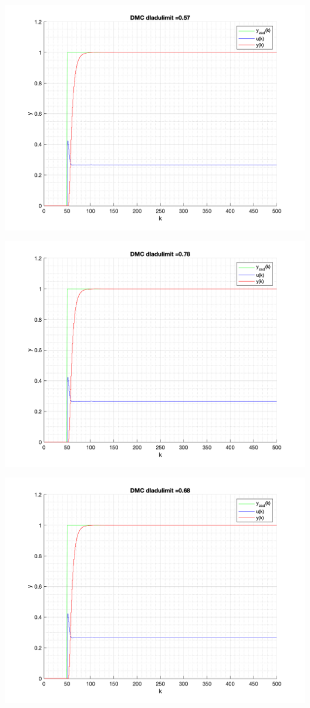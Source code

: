 \documentclass[a4paper, 11pt]{article}
\begin{document}
\begin{enumerate}
 \includegraphics[width=\linewidth]{./ModelsP6_dulimit/P4_DMC_dulimit_0_57_png.png} 
 
 \includegraphics[width=\linewidth]{./ModelsP6_dulimit/P4_DMC_dulimit_0_78_png.png} 
 
 \includegraphics[width=\linewidth]{./ModelsP6_dulimit/P4_DMC_dulimit_0_68_png.png} 
 

\end{enumerate}
\end{document}
